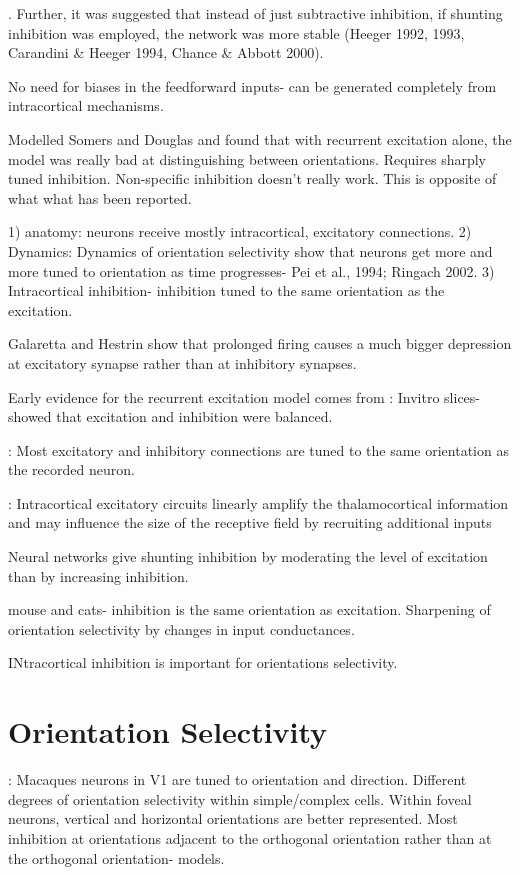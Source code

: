 \documentclass {report}
\begin{document}
\cite{Somers1995, Douglas1995}. Further, it was suggested that instead of just subtractive inhibition, if shunting inhibition was employed, the network was more stable (Heeger 1992, 1993, Carandini \& Heeger 1994, Chance \& Abbott 2000).

\cite{Adorjan1999} No need for biases in the feedforward inputs- can be generated completely from intracortical mechanisms.

\cite{Carandini1997} Modelled Somers and Douglas and found that with recurrent excitation alone, the model was really bad at distinguishing between orientations. Requires sharply tuned inhibition. Non-specific inhibition doesn't really work. This is opposite of what what has been reported. 


1) anatomy: neurons receive mostly intracortical, excitatory connections. 
2) Dynamics: Dynamics of orientation selectivity show that neurons get more and more tuned to orientation as time progresses- Pei et al., 1994; Ringach 2002. 
3) Intracortical inhibition- inhibition tuned to the same orientation as the excitation.

\cite{Nelson1998} Galaretta and Hestrin show that prolonged firing causes a much bigger depression at excitatory synapse rather than at inhibitory synapses.

Early evidence for the recurrent excitation model comes from 
\cite{Shu2003}: Invitro slices- showed that excitation and inhibition were balanced. 

\cite{Monier2003}: Most excitatory and inhibitory connections are tuned to the same orientation as the recorded neuron.

\cite{Li2013}: Intracortical excitatory circuits linearly amplify the thalamocortical information and may influence the size of the receptive field by recruiting additional inputs

\cite{Sato2016} Neural networks give shunting inhibition by moderating the level of excitation than by increasing inhibition.

\cite{Tan2011a} mouse and cats- inhibition is the same orientation as excitation. Sharpening of orientation selectivity by changes in input conductances.

\cite{Shapley2007} INtracortical inhibition is important for orientations selectivity.
\section{Orientation Selectivity}
\cite{DeValois1982}: Macaques neurons in V1 are tuned to orientation and direction. Different degrees of orientation selectivity within simple/complex cells. Within foveal neurons, vertical and horizontal orientations are better represented. Most inhibition at orientations adjacent to the orthogonal orientation rather than at the orthogonal orientation- models.
\end{document}
